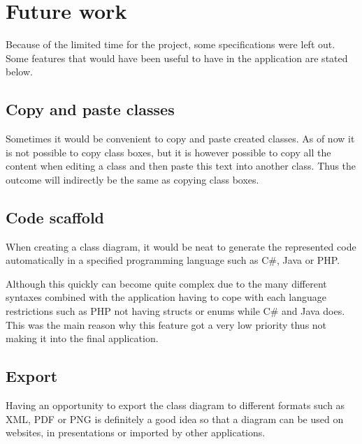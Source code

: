 \section{Future work}
\label{sec:future_work}

Because of the limited time for the project, some specifications were left out. Some features that would have been useful to have in the application are stated below.

\subsection{Copy and paste classes}
Sometimes it would be convenient to copy and paste created classes. As of now it is not possible to copy class boxes, but it is however possible to copy all the content when editing a class and then paste this text into another class. Thus the outcome will indirectly be the same as copying class boxes.

\subsection{Code scaffold}
When creating a class diagram, it would be neat to generate the represented code automatically in a specified programming language such as C\#, Java or PHP. 

Although this quickly can become quite complex due to the many different syntaxes combined with the application having to cope with each language restrictions such as PHP not having structs or enums while C\# and Java does. This was the main reason why this feature got a very low priority thus not making it into the final application.

\subsection{Export}
Having an opportunity to export the class diagram to different formats such as XML, PDF or PNG is definitely a good idea so that a diagram can be used on websites, in presentations or imported by other applications.